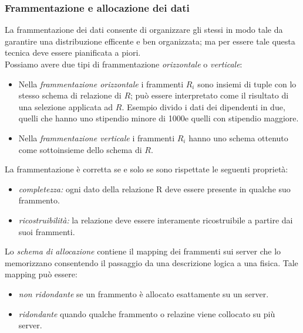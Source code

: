 \subsubsection{Frammentazione e allocazione dei dati}
La frammentazione dei dati consente di organizzare gli stessi in modo tale da garantire una distribuzione efficente e ben organizzata; ma per essere tale questa tecnica deve essere pianificata a piori.\\
Possiamo avere due tipi di frammentazione \emph{orizzontale} o \emph{verticale}:
\begin{itemize}
\item Nella \emph{frammentazione orizzontale} i frammenti $R_i$ sono insiemi di tuple con lo stesso schema di relazione di $R$; può essere interpretato come il risultato di una selezione applicata ad $R$.
Esempio divido i dati dei dipendenti in due, quelli che hanno uno stipendio minore di 1000\EUR e quelli con stipendio maggiore.
\item Nella  \emph{frammentazione verticale} i frammenti $R_i$ hanno uno schema ottenuto come sottoinsieme dello schema di $R$.
\end{itemize}
La frammentazione è corretta se e solo se sono rispettate le seguenti proprietà:
\begin{itemize}
\item \emph{completezza:} ogni dato della relazione R deve essere presente in qualche suo frammento. 
\item  \emph{ricostruibilità:} la relazione deve essere interamente ricostruibile a partire dai suoi frammenti.
\end{itemize}
Lo \emph{schema di allocazione} contiene il mapping dei frammenti sui server che lo memorizzano consentendo il passaggio da una descrizione logica a una fisica.
Tale mapping può essere:
\begin{itemize}
\item \emph{non ridondante} se un frammento è allocato esattamente su un server.
\item \emph{ridondante} quando qualche frammento o relazine viene collocato su più server.
\end{itemize}

